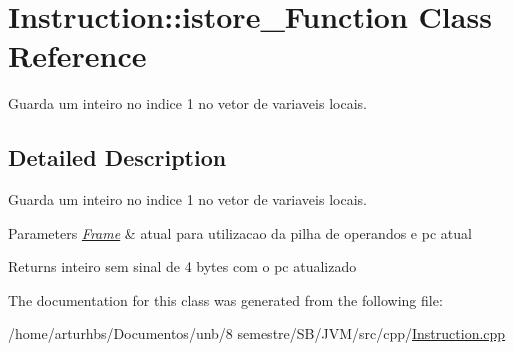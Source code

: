 \hypertarget{classInstruction_1_1istore__1Function}{}\section{Instruction\+:\+:istore\+\_\+Function Class Reference}
\label{classInstruction_1_1istore__1Function}


Guarda um inteiro no indice 1 no vetor de variaveis locais.  




\subsection{Detailed Description}
Guarda um inteiro no indice 1 no vetor de variaveis locais. 


\begin{DoxyParams}{Parameters}
{\em \hyperlink{classFrame}{Frame}} & atual para utilizacao da pilha de operandos e pc atual \\
\hline
\end{DoxyParams}
\begin{DoxyReturn}{Returns}
inteiro sem sinal de 4 bytes com o pc atualizado 
\end{DoxyReturn}


The documentation for this class was generated from the following file\+:\begin{DoxyCompactItemize}
\item 
/home/arturhbs/\+Documentos/unb/8 semestre/\+S\+B/\+J\+V\+M/src/cpp/\hyperlink{Instruction_8cpp}{Instruction.\+cpp}\end{DoxyCompactItemize}
